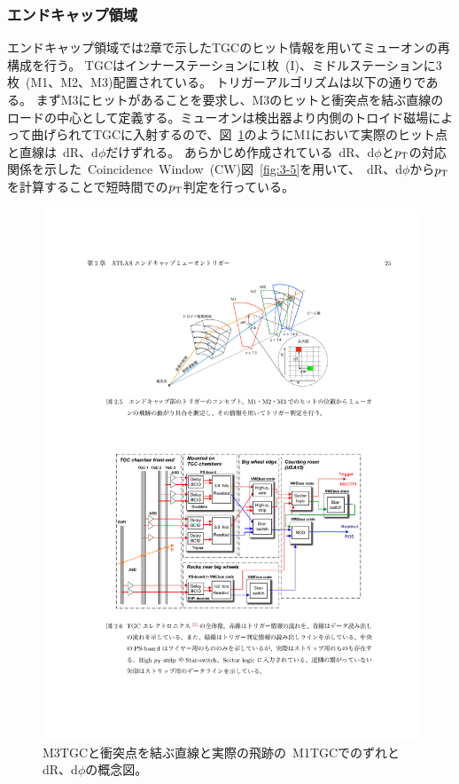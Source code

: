 \subsubsection{エンドキャップ領域}
エンドキャップ領域では2章で示したTGCのヒット情報を用いてミューオンの再構成を行う。
TGCはインナーステーションに1枚~(I)、ミドルステーションに3枚~(M1、M2、M3)配置されている。
トリガーアルゴリズムは以下の通りである。
まずM3にヒットがあることを要求し、M3のヒットと衝突点を結ぶ直線のロードの中心として定義する。ミューオンは検出器より内側のトロイド磁場によって曲げられてTGCに入射するので、図~\ref{fig:3-4}のようにM1において実際のヒット点と直線は~dR、d$\phi$だけずれる。
あらかじめ作成されている~dR、d$\phi$と$p_\mathrm{T}$の対応関係を示した~Coincidence~Window~(CW)図~\ref{fig:3-5}を用いて、~dR、d$\phi$から$p_\mathrm{T}$を計算することで短時間での$p_\mathrm{T}$判定を行っている。

\begin{figure}[h]
  \centering
  \includegraphics[clip, width=12cm]{fig/3/akatsuka_mt_trigger_scheme.pdf}
  \caption{M3TGCと衝突点を結ぶ直線と実際の飛跡の~M1TGCでのずれとdR、d$\phi$の概念図\cite{article:akatsuka}。}
  \label{fig:3-4}
\end{figure}

